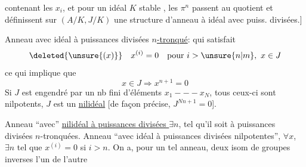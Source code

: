contenant les $x_i$, et pour un idéal $K$ stable , les $\pi^n$ passent au quotient et définissent sur $(A/K,J/K)$ une structure d'anneau à idéal avec puiss. divisées.]

Anneau avec idéal à puissances divisées \uline{$n$-tronqué}: qui satisfait
\[
\deleted{\unsure{(x)}}\quad x^{(i)}=0\quad\text{pour }i>\unsure{n|m},\ x\in J
\]
ce qui implique que
\[
x\in J\Longrightarrow x^{n+1}=0
\]
Si $J$ est engendré par un nb fini d'éléments $x_1---x_N$, tous ceux-ci sont nilpotents, $J$ est un \uline{nilidéal} [de façon précise, $J^{Nn+1}=0$]. 

Anneau ``avec'' \uline{nilidéal à puissances divisées }  $\exists n$, tel  qu'il soit  à puissances divisées $n$-tronquées. Anneau ``avec idéal à puissances divisées nilpotentes'', $\forall x$, $\exists n$ tel que $x^{(i)}=0$ si $i>n$. On a, pour un tel anneau, deux isom de groupes inverses l'un de l'autre

